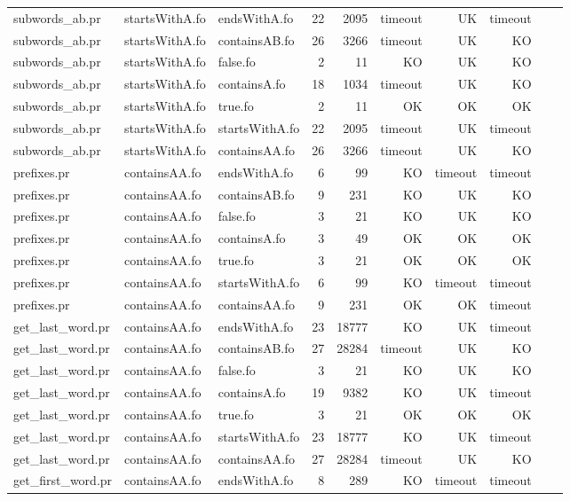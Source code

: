\begin{tabular}{l|l|l|r|r|r|r|r|r|r}
subwords\_ab.pr & startsWithA.fo & endsWithA.fo & 22 & 2095 & timeout & 
UK & timeout \\
subwords\_ab.pr & startsWithA.fo & containsAB.fo & 26 & 3266 & timeout & 
UK & KO \\
subwords\_ab.pr & startsWithA.fo & false.fo & 2 & 11 & KO & 
UK & KO \\
subwords\_ab.pr & startsWithA.fo & containsA.fo & 18 & 1034 & timeout & 
UK & KO \\
subwords\_ab.pr & startsWithA.fo & true.fo & 2 & 11 & OK & 
OK & OK \\
subwords\_ab.pr & startsWithA.fo & startsWithA.fo & 22 & 2095 & timeout & 
UK & timeout \\
subwords\_ab.pr & startsWithA.fo & containsAA.fo & 26 & 3266 & timeout & 
UK & KO \\
prefixes.pr & containsAA.fo & endsWithA.fo & 6 & 99 & KO & 
timeout & timeout \\
prefixes.pr & containsAA.fo & containsAB.fo & 9 & 231 & KO & 
UK & KO \\
prefixes.pr & containsAA.fo & false.fo & 3 & 21 & KO & 
UK & KO \\
prefixes.pr & containsAA.fo & containsA.fo & 3 & 49 & OK & 
OK & OK \\
prefixes.pr & containsAA.fo & true.fo & 3 & 21 & OK & 
OK & OK \\
prefixes.pr & containsAA.fo & startsWithA.fo & 6 & 99 & KO & 
timeout & timeout \\
prefixes.pr & containsAA.fo & containsAA.fo & 9 & 231 & OK & 
OK & timeout \\
get\_last\_word.pr & containsAA.fo & endsWithA.fo & 23 & 18777 & KO & 
UK & timeout \\
get\_last\_word.pr & containsAA.fo & containsAB.fo & 27 & 28284 & timeout & 
UK & KO \\
get\_last\_word.pr & containsAA.fo & false.fo & 3 & 21 & KO & 
UK & KO \\
get\_last\_word.pr & containsAA.fo & containsA.fo & 19 & 9382 & KO & 
UK & timeout \\
get\_last\_word.pr & containsAA.fo & true.fo & 3 & 21 & OK & 
OK & OK \\
get\_last\_word.pr & containsAA.fo & startsWithA.fo & 23 & 18777 & KO & 
UK & timeout \\
get\_last\_word.pr & containsAA.fo & containsAA.fo & 27 & 28284 & timeout & 
UK & KO \\
get\_first\_word.pr & containsAA.fo & endsWithA.fo & 8 & 289 & KO & 
timeout & timeout \\

\end{tabular}
